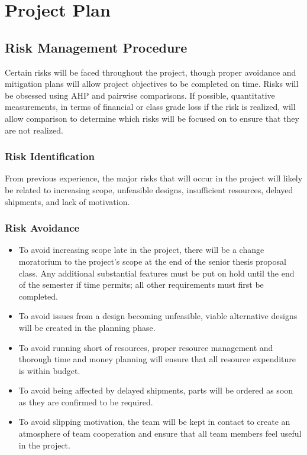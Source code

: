 \chapter{Project Plan}
\section{Risk Management Procedure}
Certain risks will be faced throughout the project, though proper avoidance and mitigation plans will allow project objectives to be completed on time.
Risks will be obsessed using AHP and pairwise comparisons.
If possible, quantitative measurements, in terms of financial or class grade loss if the risk is realized, will allow comparison to determine which risks will be focused on to ensure that they are not realized.

\subsection{Risk Identification}
From previous experience, the major risks that will occur in the project will likely be related to increasing scope, unfeasible designs, insufficient resources, delayed shipments, and lack of motivation.

\subsection{Risk Avoidance}
\begin{itemize} \parskip2pt
	\item To avoid increasing scope late in the project, there will be a change moratorium to the project’s scope at the end of the senior thesis proposal class. Any additional substantial features must be put on hold until the end of the semester if time permits; all other requirements must first be completed.
	\item To avoid issues from a design becoming unfeasible, viable alternative designs will be created in the planning phase.
	\item To avoid running short of resources, proper resource management and thorough time and money planning will ensure that all resource expenditure is within budget.
	\item To avoid being affected by delayed shipments, parts will be ordered as soon as they are confirmed to be required.
	\item To avoid slipping motivation, the team will be kept in contact to create an atmosphere of team cooperation and ensure that all team members feel useful in the project.
\end{itemize}	

